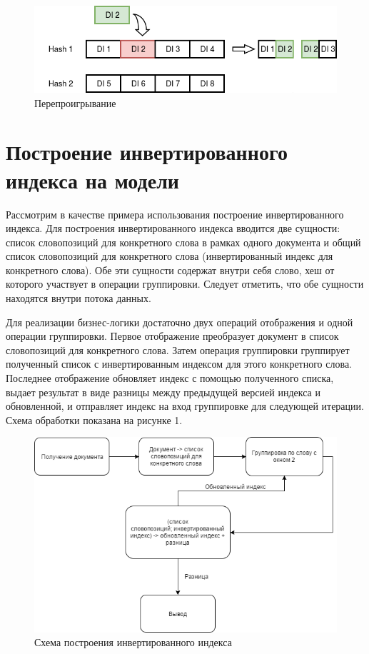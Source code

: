 \documentclass[14pt]{matmex-diploma-custom}
\begin{document}
\begin{figure}
  \centering
	\includegraphics[width=1.0\textwidth]{pics/invalid.png}
	\caption{Перепроигрывание}
\end{figure}

\section{Построение инвертированного индекса на модели}

Рассмотрим в качестве примера использования построение инвертированного индекса. Для построения инвертированного индекса вводится две сущности: список словопозиций для конкретного слова в рамках одного документа и общий список словопозиций для конкретного слова (инвертированный индекс для конкретного слова). Обе эти сущности содержат внутри себя слово, хеш от которого участвует в операции группировки. Следует отметить, что обе сущности находятся внутри потока данных.

Для реализации бизнес-логики достаточно двух операций отображения и одной операции группировки. Первое отображение преобразует документ в список словопозиций для конкретного слова. Затем операция группировки группирует полученный список с инвертированным индексом для этого конкретного слова. Последнее отображение обновляет индекс с помощью полученного списка, выдает результат в виде разницы между предыдущей версией индекса и обновленной, и отправляет индекс на вход группировке для следующей итерации. Схема обработки показана на рисунке 1.

\begin{figure}[h]
\centering
\includegraphics[width=\textwidth,height=\textheight,keepaspectratio]{pics/II.png}
\caption{Схема построения инвертированного индекса}
\end{figure}
\end{document}
